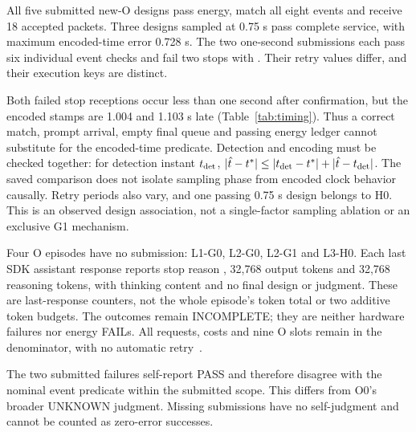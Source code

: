 


All five submitted new-O designs pass energy, match all eight events
and receive 18 accepted packets. Three designs sampled at 0.75 s
pass complete service, with maximum encoded-time error 0.728 s.
The two one-second submissions each pass six individual event
checks and fail two stops with . Their
retry values differ, and their execution keys are distinct.



Both failed stop receptions occur less than one second after
confirmation, but the encoded stamps are 1.004 and 1.103 s late
(Table~\ref{tab:timing}). Thus a correct match, prompt arrival,
empty final queue and passing energy ledger cannot substitute for
the encoded-time predicate. Detection and encoding must be checked
together: for detection instant $t_{\rm det}$,
$|\hat t-t^*|\leq|t_{\rm det}-t^*|+|\hat t-t_{\rm det}|$.
The saved comparison does not isolate sampling phase from encoded
clock behavior causally. Retry periods also vary, and one passing
0.75 s design belongs to H0. This is an observed design association,
not a single-factor sampling ablation or an exclusive G1 mechanism.

Four O episodes have no submission: L1-G0, L2-G0, L2-G1 and L3-H0.
Each last SDK assistant response reports stop reason ,
32,768 output tokens and 32,768 reasoning tokens, with thinking
content and no final design or judgment. These are last-response
counters, not the whole episode's token total or two additive token
budgets. The outcomes remain INCOMPLETE; they are neither hardware
failures nor energy FAILs. All requests, costs and nine O slots
remain in the denominator, with no automatic retry~\cite{final}.

The two submitted failures self-report PASS and therefore disagree
with the nominal event predicate within the submitted scope. This
differs from O0's broader UNKNOWN judgment. Missing submissions
have no self-judgment and cannot be counted as zero-error successes.
\FloatBarrier

